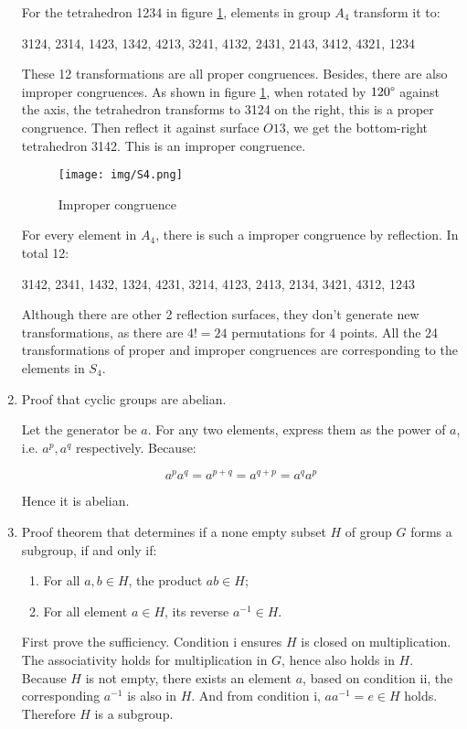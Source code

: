 \documentclass[UTF8]{article}
\begin{document}
\begin{enumerate}
For the tetrahedron 1234 in figure \ref{fig:S4}, elements in group $A_4$ transform it to:

3124, 2314, 1423, 1342, 4213, 3241, 4132, 2431, 2143, 3412, 4321, 1234

These 12 transformations are all proper congruences. Besides, there are also improper congruences. As shown in figure \ref{fig:S4}, when rotated by $120\degree$ against the axis, the tetrahedron transforms to 3124 on the right, this is a proper congruence. Then reflect it against surface $O13$, we get the bottom-right tetrahedron 3142. This is an improper congruence.

\begin{figure}[htbp]
 \centering
 \texttt{[image: img/S4.png]}
 \caption{Improper congruence}
 \label{fig:S4}
\end{figure}

For every element in $A_4$, there is such a improper congruence by reflection. In total 12:

3142, 2341, 1432, 1324, 4231, 3214, 4123, 2413, 2134, 3421, 4312, 1243

Although there are other 2 reflection surfaces, they don't generate new transformations, as there are $4! = 24$ permutations for 4 points. All the 24 transformations of proper and improper congruences are corresponding to the elements in $S_4$.

\item {Proof that cyclic groups are abelian.}

Let the generator be $a$. For any two elements, express them as the power of $a$, i.e. $a^p, a^q$ respectively. Because:

\[
a^p a^q = a^{p + q} = a^{q + p} = a^q a^p
\]

Hence it is abelian.

\item {Proof theorem that determines if a none empty subset $H$ of group $G$ forms a subgroup, if and only if:
  \begin{enumerate}[i]
  \item For all $a, b \in H$, the product $ab \in H$;
  \item For all element $a \in H$, its reverse $a^{-1} \in H$.
  \end{enumerate}
}

First prove the sufficiency. Condition i ensures $H$ is closed on multiplication. The associativity holds for multiplication in $G$, hence also holds in $H$. Because $H$ is not empty, there exists an element $a$, based on condition ii, the corresponding $a^{-1}$ is also in $H$. And from condition i, $aa^{-1} = e \in H$ holds. Therefore $H$ is a subgroup.


\end{enumerate}
\end{document}
